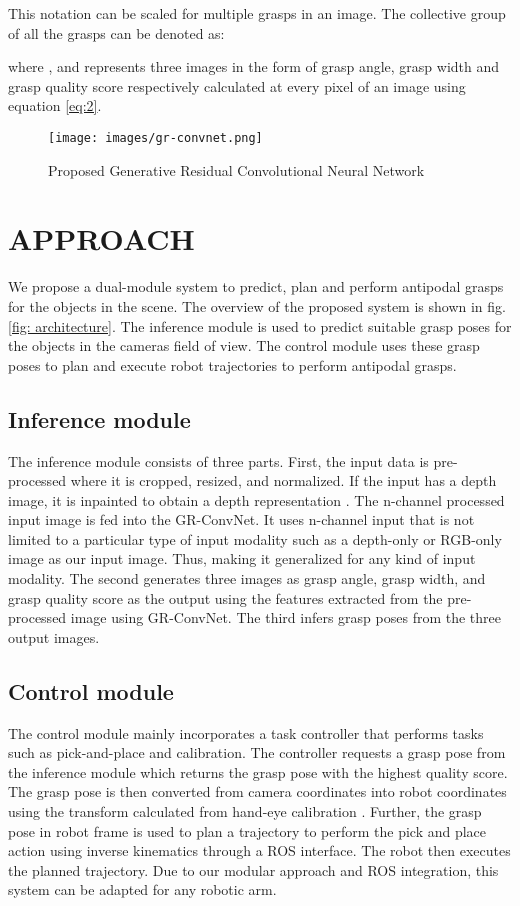 \documentclass[letterpaper, 10 pt, conference]{ieeeconf}
\begin{document}
This notation can be scaled for multiple grasps in an image. The collective group of all the grasps can be denoted as:

where , and  represents three images in the form of grasp angle, grasp width and grasp quality score respectively calculated at every pixel of an image using equation \eqref{eq:2}. 



\begin{figure*}
    \centering
    \vspace*{0.2cm}
    \texttt{[image: images/gr-convnet.png]}
    \caption{Proposed Generative Residual Convolutional Neural Network}
    \label{fig: network}
\end{figure*}

\section{APPROACH}


We propose a dual-module system to predict, plan and perform antipodal grasps for the objects in the scene. The overview of the proposed system is shown in fig.\ref{fig: architecture}. The inference module is used to predict suitable grasp poses for the objects in the camera\textquotesingle s field of view. The control module uses these grasp poses to plan and execute robot trajectories to perform antipodal grasps.

\subsection{Inference module}
The inference module consists of three parts. First, the input data is pre-processed where it is cropped, resized, and normalized. If the input has a depth image, it is inpainted to obtain a depth representation \cite{xue2017depth}. The  n-channel processed input image is fed into the GR-ConvNet. It uses n-channel input that is not limited to a particular type of input modality such as a depth-only or RGB-only image as our input image. Thus, making it generalized for any kind of input modality. The second generates three images as grasp angle, grasp width, and grasp quality score as the output using the features extracted from the pre-processed image using GR-ConvNet. The third infers grasp poses from the three output images.

\subsection{Control module}
The control module mainly incorporates a task controller that performs tasks such as pick-and-place and calibration. The controller requests a grasp pose from the inference module which returns the grasp pose with the highest quality score. The grasp pose is then converted from camera coordinates into robot coordinates using the transform calculated from hand-eye calibration \cite{strobl2006optimal}. Further, the grasp pose in robot frame is used to plan a trajectory to perform the pick and place action using inverse kinematics through a ROS interface. The robot then executes the planned trajectory. Due to our modular approach and ROS integration, this system can be adapted for any robotic arm.
\end{document}
